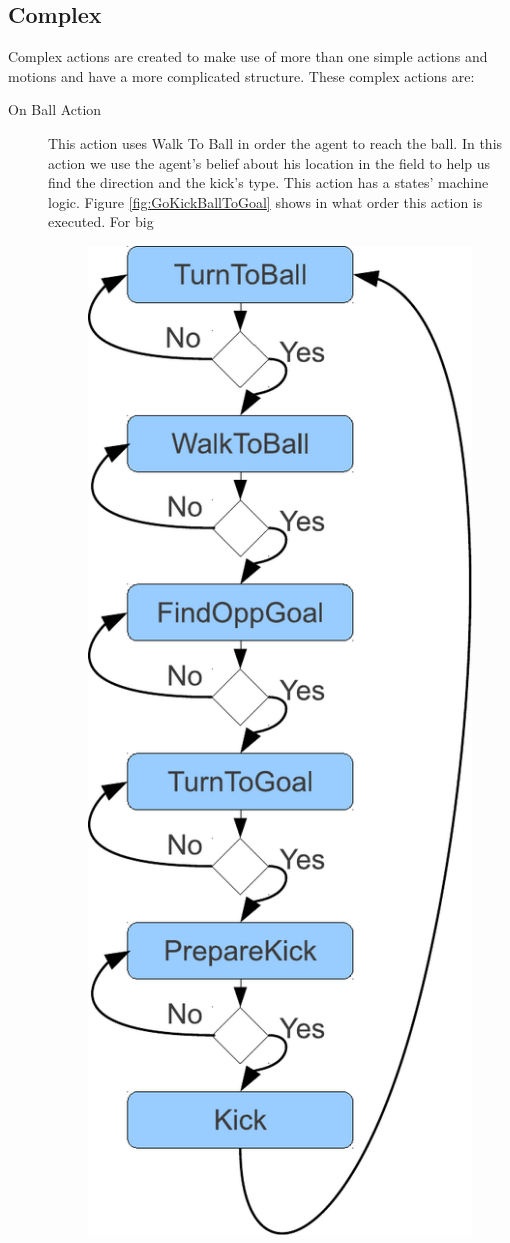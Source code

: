 \subsection{Complex}
Complex actions are created to make use of more than one simple actions and motions and have a more complicated structure. These complex actions are:
\begin{description}
 \item[On Ball Action] This action uses Walk To Ball in order the agent to reach the ball. In this action we use the agent's belief about his location in the field to help us find the direction and the kick's type. This action has a states' machine logic. Figure \ref{fig:GoKickBallToGoal} shows in what order this action is executed. For big 
 \begin{figure}[!h]
\centering
  \includegraphics[scale=0.5]{Chapter3/figures/KickFSM.pdf}

\end{figure}
\end{description}
